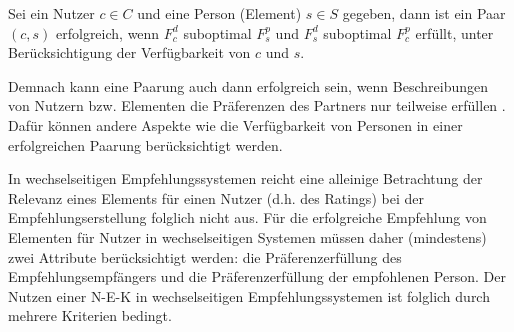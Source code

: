 \begin{definition}\label{def:2}
    Sei ein Nutzer $c \in C$ und eine Person (Element) $s \in S$ gegeben, dann ist ein Paar $(c,s)$ erfolgreich, wenn $F_{c}^{d}$ suboptimal $F_{s}^{p}$ und $F_{s}^{d}$ suboptimal $F_{c}^{p}$ erfüllt, unter Berücksichtigung der Verfügbarkeit von $c$ und $s$.
\end{definition}

Demnach kann eine Paarung auch dann erfolgreich sein, wenn Beschreibungen von Nutzern bzw. Elementen die Präferenzen des Partners nur teilweise erfüllen \cite[S. 37]{li:inproceedings}.
Dafür können andere Aspekte wie die Verfügbarkeit von Personen in einer erfolgreichen Paarung berücksichtigt werden.


In wechselseitigen Empfehlungssystemen reicht eine alleinige Betrachtung der Relevanz eines Elements für einen Nutzer (d.h. des Ratings) bei der Empfehlungserstellung folglich nicht aus.
Für die erfolgreiche Empfehlung von Elementen für Nutzer in wechselseitigen Systemen müssen daher (mindestens) zwei Attribute berücksichtigt werden: die Präferenzerfüllung des Empfehlungsempfängers und die Präferenzerfüllung der empfohlenen Person.
Der Nutzen einer \ac{N-E-K} in wechselseitigen Empfehlungssystemen ist folglich durch mehrere Kriterien bedingt.

